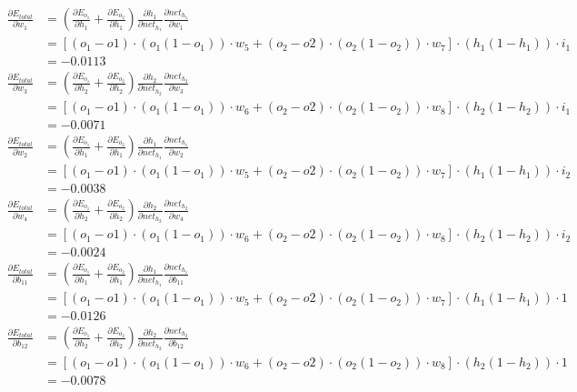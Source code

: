 \documentclass[12pt,a4paper]{article}
\begin{document}
\begin{align*}
	\frac{\partial E_{total}}{\partial w_1} & = \left(\frac{\partial E_{o_1}}{\partial h_1} + \frac{\partial E_{o_2}}{\partial h_1}\right)  \frac{\partial h_1}{\partial net_{h_1}} \frac{\partial net_{h_1}}{\partial w_1} \\ &= [(o_1 - o1) \cdot  (o_1  (1 - o_1)) \cdot  w_5 + (o_2 - o2) \cdot  (o_2  (1 - o_2)) \cdot  w_7] \cdot (h_1  (1 - h_1)) \cdot i_1 \\
	&= -0.0113\\
	\frac{\partial E_{total}}{\partial w_3} & = \left(\frac{\partial E_{o_1}}{\partial h_2} + \frac{\partial E_{o_2}}{\partial h_2}\right)  \frac{\partial h_2}{\partial net_{h_2}} \frac{\partial net_{h_2}}{\partial w_3} \\ &= [(o_1 - o1) \cdot  (o_1  (1 - o_1)) \cdot  w_6 + (o_2 - o2) \cdot  (o_2  (1 - o_2)) \cdot  w_8] \cdot (h_2  (1 - h_2)) \cdot i_1 \\
	&= -0.0071 \\
 	\frac{\partial E_{total}}{\partial w_2} & = \left(\frac{\partial E_{o_1}}{\partial h_1} + \frac{\partial E_{o_2}}{\partial h_1}\right)  \frac{\partial h_1}{\partial net_{h_1}} \frac{\partial net_{h_1}}{\partial w_2} \\ &= [(o_1 - o1) \cdot  (o_1  (1 - o_1)) \cdot  w_5 + (o_2 - o2) \cdot  (o_2  (1 - o_2)) \cdot  w_7] \cdot (h_1  (1 - h_1)) \cdot i_2 \\
	&= -0.0038 \\
 	\frac{\partial E_{total}}{\partial w_4} & = \left(\frac{\partial E_{o_1}}{\partial h_2} + \frac{\partial E_{o_2}}{\partial h_2}\right)  \frac{\partial h_2}{\partial net_{h_2}} \frac{\partial net_{h_2}}{\partial w_4} \\ &= [(o_1 - o1) \cdot  (o_1  (1 - o_1)) \cdot  w_6 + (o_2 - o2) \cdot  (o_2  (1 - o_2)) \cdot  w_8] \cdot (h_2  (1 - h_2)) \cdot i_2 \\
	&= -0.0024 \\
  	\frac{\partial E_{total}}{\partial b_{11}} & = \left(\frac{\partial E_{o_1}}{\partial h_1} + \frac{\partial E_{o_2}}{\partial h_1}\right)  \frac{\partial h_1}{\partial net_{h_1}} \frac{\partial net_{h_1}}{\partial b_{11}} \\ & = [(o_1 - o1) \cdot  (o_1  (1 - o_1)) \cdot  w_5 + (o_2 - o2) \cdot  (o_2  (1 - o_2)) \cdot  w_7] \cdot (h_1  (1 - h_1)) \cdot {1} \\
	&= -0.0126 \\
  	\frac{\partial E_{total}}{\partial b_{12}} & = \left(\frac{\partial E_{o_1}}{\partial h_2} + \frac{\partial E_{o_2}}{\partial h_2}\right)  \frac{\partial h_2}{\partial net_{h_2}} \frac{\partial net_{h_2}}{\partial b_{12}} \\ &= [(o_1 - o1) \cdot  (o_1  (1 - o_1)) \cdot  w_6 + (o_2 - o2) \cdot  (o_2  (1 - o_2)) \cdot  w_8] \cdot (h_2  (1 - h_2)) \cdot {1} \\
	&= -0.0078 \\
\end{align*}
\end{document}
